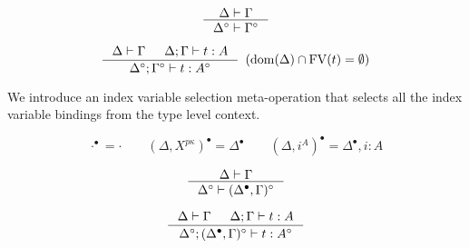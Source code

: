 \begin{theorem}
\label{thm:Fixierasetmctx}
\[ \inference{\Delta |- \Gamma}{\Delta^\circ |- \Gamma^\circ} \]
\end{theorem}

\begin{theorem}
\label{thm:Fixierasetypingifree}
\[ \inference{ \Delta |- \Gamma & \Delta;\Gamma |- t : A}
		{\Delta^\circ;\Gamma^\circ |- t : A^\circ}
		{\enspace(\dom(\Delta)\cap\FV(t) = \emptyset)}
\]
\end{theorem}


We introduce an index variable selection meta-operation that selects all
the index variable bindings from the type level context.
\begin{definition}
\[ \cdot^\bullet = \cdot \qquad
	(\Delta,X^{p\kappa})^\bullet = \Delta^\bullet \qquad
	(\Delta,i^A)^\bullet = \Delta^\bullet,i:A
\]
\end{definition}

\begin{theorem}
\label{thm:Fixierasetmctxivs}
\[ \inference{\Delta |- \Gamma}{\Delta^\circ |- (\Delta^\bullet,\Gamma)^\circ}
\]
\end{theorem}

\begin{theorem}
\label{thm:Fixierasetypingall}
\[ \inference{\Delta |- \Gamma & \Delta;\Gamma |- t : A}
		{\Delta^\circ;(\Delta^\bullet,\Gamma)^\circ |- t : A^\circ}
\]
\end{theorem}

